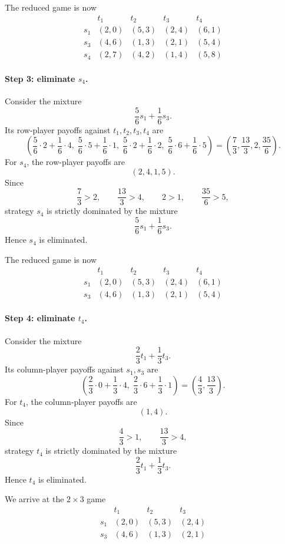 The reduced game is now
\[
\begin{array}{c|cccc}
 & t_1 & t_2 & t_3 & t_4\\
\hline
s_1 & (2,0) & (5,3) & (2,4) & (6,1)\\
s_3 & (4,6) & (1,3) & (2,1) & (5,4)\\
s_4 & (2,7) & (4,2) & (1,4) & (5,8)
\end{array}
\]

\paragraph{Step 3: eliminate \(s_4\).}
Consider the mixture
\[
\frac56 s_1+\frac16 s_3.
\]
Its row-player payoffs against \(t_1,t_2,t_3,t_4\) are
\[
\left(\frac56\cdot 2+\frac16\cdot 4,\;
\frac56\cdot 5+\frac16\cdot 1,\;
\frac56\cdot 2+\frac16\cdot 2,\;
\frac56\cdot 6+\frac16\cdot 5\right)
=
\left(\frac73,\frac{13}{3},2,\frac{35}{6}\right).
\]
For \(s_4\), the row-player payoffs are
\[
(2,4,1,5).
\]
Since
\[
\frac73>2,\qquad \frac{13}{3}>4,\qquad 2>1,\qquad \frac{35}{6}>5,
\]
strategy \(s_4\) is strictly dominated by the mixture
\[
\frac56 s_1+\frac16 s_3.
\]
Hence \(s_4\) is eliminated.

The reduced game is now
\[
\begin{array}{c|cccc}
 & t_1 & t_2 & t_3 & t_4\\
\hline
s_1 & (2,0) & (5,3) & (2,4) & (6,1)\\
s_3 & (4,6) & (1,3) & (2,1) & (5,4)
\end{array}
\]

\paragraph{Step 4: eliminate \(t_4\).}
Consider the mixture
\[
\frac23 t_1+\frac13 t_3.
\]
Its column-player payoffs against \(s_1,s_3\) are
\[
\left(\frac23\cdot 0+\frac13\cdot 4,\;
\frac23\cdot 6+\frac13\cdot 1\right)
=
\left(\frac43,\frac{13}{3}\right).
\]
For \(t_4\), the column-player payoffs are
\[
(1,4).
\]
Since
\[
\frac43>1,\qquad \frac{13}{3}>4,
\]
strategy \(t_4\) is strictly dominated by the mixture
\[
\frac23 t_1+\frac13 t_3.
\]
Hence \(t_4\) is eliminated.

We arrive at the \(2\times 3\) game
\[
\boxed{
\begin{array}{c|ccc}
 & t_1 & t_2 & t_3\\
\hline
s_1 & (2,0) & (5,3) & (2,4)\\
s_3 & (4,6) & (1,3) & (2,1)
\end{array}}
\]

